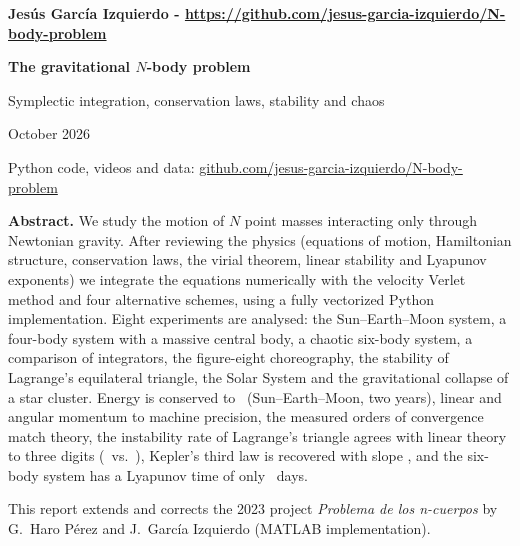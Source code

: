 \documentclass[11pt,a4paper]{article}
\newcommand{\repo}{\href{https://github.com/jesus-garcia-izquierdo/N-body-problem}{github.com/jesus-garcia-izquierdo/N-body-problem}}
\begin{document}
\begin{titlepage}
\centering
\vspace*{2.5cm}
{\Large\bfseries Jesús García Izquierdo - {\hypersetup{urlcolor=black}\url{https://github.com/jesus-garcia-izquierdo/N-body-problem}}\par}
\vspace{0.6cm}
{\LARGE\bfseries The gravitational $N$-body problem\par}
\vspace{0.25cm}
{\large Symplectic integration, conservation laws, stability and chaos\par}
\vspace{1.5cm}
{\normalsize October 2026\par}
\vspace{1.2cm}
{\small Python code, videos and data: \repo\par}
\vspace{2cm}
\begin{minipage}{0.86\textwidth}
\small
\textbf{Abstract.} We study the motion of $N$ point masses interacting only through
Newtonian gravity. After reviewing the physics (equations of motion, Hamiltonian
structure, conservation laws, the virial theorem, linear stability and Lyapunov
exponents) we integrate the equations numerically with the velocity Verlet method and
four alternative schemes, using a fully vectorized Python implementation. Eight
experiments are analysed: the Sun--Earth--Moon system, a four-body system with a
massive central body, a chaotic six-body system, a comparison of integrators, the
figure-eight choreography, the stability of Lagrange's equilateral triangle, the Solar
System and the gravitational collapse of a star cluster. Energy is conserved to
\SemErrE\ (Sun--Earth--Moon, two years), linear and angular momentum to machine
precision, the measured orders of convergence match theory, the instability rate of
Lagrange's triangle agrees with linear theory to three digits
(\LagSigma\ vs.\ \LagSigmaTh), Kepler's third law is recovered with slope \SolarSlope,
and the six-body system has a Lyapunov time of only \ChaosLyapDays\ days.
\end{minipage}
\vfill
{\footnotesize This report extends and corrects the 2023 project
\emph{Problema de los n-cuerpos} by G.~Haro Pérez and J.~García Izquierdo
(MATLAB implementation).\par}
\end{titlepage}
\end{document}
